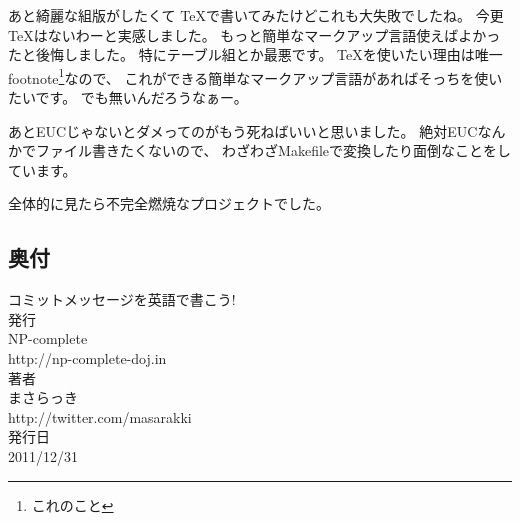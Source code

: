 \documentclass{jarticle}
\begin{document}
  あと綺麗な組版がしたくて \TeX で書いてみたけどこれも大失敗でしたね。
  今更 \TeX はないわーと実感しました。
  もっと簡単なマークアップ言語使えばよかったと後悔しました。
  特にテーブル組とか最悪です。
  \TeX を使いたい理由は唯一footnote\footnote{これのこと}なので、
  これができる簡単なマークアップ言語があればそっちを使いたいです。
  でも無いんだろうなぁー。

  あとEUCじゃないとダメってのがもう死ねばいいと思いました。
  絶対EUCなんかでファイル書きたくないので、
  わざわざMakefileで変換したり面倒なことをしています。

  全体的に見たら不完全燃焼なプロジェクトでした。

  \newpage
  \begin{center}
   \Large
   \section*{奥付}
   {\huge コミットメッセージを英語で書こう!}
   \\[2.0cm]
   発行\\
   NP-complete\\
   http://np-complete-doj.in
   \\[1.5cm]
   著者\\
   まさらっき\\
   http://twitter.com/masarakki
   \\[2.5cm]
   発行日\\
   2011/12/31
  \end{center}
\end{document}
